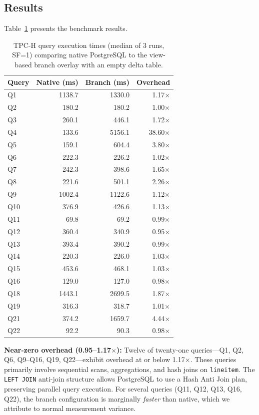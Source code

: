 \documentclass[sigplan, nonacm]{acmart}
\begin{document}
\subsection{Results}

Table~\ref{tab:results} presents the benchmark results.

\begin{table}[h]
\centering
\small
\begin{tabular}{lrrr}
\hline
\textbf{Query} & \textbf{Native (ms)} & \textbf{Branch (ms)} & \textbf{Overhead} \\
\hline
Q1  & 1138.7 & 1330.0 & 1.17$\times$ \\
Q2  & 180.2  & 180.2  & 1.00$\times$ \\
Q3  & 260.1  & 446.1  & 1.72$\times$ \\
Q4  & 133.6  & 5156.1 & 38.60$\times$ \\
Q5  & 159.1  & 604.4  & 3.80$\times$ \\
Q6  & 222.3  & 226.2  & 1.02$\times$ \\
Q7  & 242.3  & 398.6  & 1.65$\times$ \\
Q8  & 221.6  & 501.1  & 2.26$\times$ \\
Q9  & 1002.4 & 1122.6 & 1.12$\times$ \\
Q10 & 376.9  & 426.6  & 1.13$\times$ \\
Q11 & 69.8   & 69.2   & 0.99$\times$ \\
Q12 & 360.4  & 340.9  & 0.95$\times$ \\
Q13 & 393.4  & 390.2  & 0.99$\times$ \\
Q14 & 220.3  & 226.0  & 1.03$\times$ \\
Q15 & 453.6  & 468.1  & 1.03$\times$ \\
Q16 & 129.0  & 127.0  & 0.98$\times$ \\
Q18 & 1443.1 & 2699.5 & 1.87$\times$ \\
Q19 & 316.3  & 318.7  & 1.01$\times$ \\
Q21 & 374.2  & 1659.7 & 4.44$\times$ \\
Q22 & 92.2   & 90.3   & 0.98$\times$ \\
\hline
\end{tabular}
\caption{TPC-H query execution times (median of 3 runs, SF=1) comparing native PostgreSQL to the view-based branch overlay with an empty delta table.}
\label{tab:results}
\end{table}

\textbf{Near-zero overhead (0.95--1.17$\times$):} Twelve of twenty-one queries---Q1, Q2, Q6, Q9--Q16, Q19, Q22---exhibit overhead at or below 1.17$\times$. These queries primarily involve sequential scans, aggregations, and hash joins on \texttt{lineitem}. The \texttt{LEFT~JOIN} anti-join structure allows PostgreSQL to use a Hash Anti Join plan, preserving parallel query execution. For several queries (Q11, Q12, Q13, Q16, Q22), the branch configuration is marginally \emph{faster} than native, which we attribute to normal measurement variance.
\end{document}
